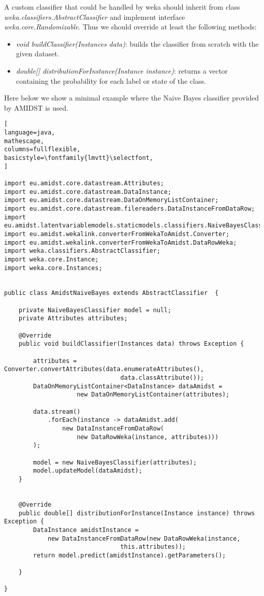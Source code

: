 \documentclass[10pt,a4paper]{article}
\begin{document}
A custom classifier that could be handled by weka should inherit from class \textit{weka.classifiers.AbstractClassifier} and implement interface \textit{weka.core.Randomizable}. Thus we should override at least the following methods:

\begin{itemize}
	\item \textit{void buildClassifier(Instances data)}: builds the classifier from scratch with the given dataset.
	\item \textit{double[] distributionForInstance(Instance instance)}: returns a vector containing the probability for each label or state of the class.
\end{itemize}

Here below we show a minimal example where the Naive Bayes classifier provided by AMIDST is used.

\begin{lstlisting}[
language=java,
mathescape,
columns=fullflexible,
basicstyle=\fontfamily{lmvtt}\selectfont,
]

import eu.amidst.core.datastream.Attributes;
import eu.amidst.core.datastream.DataInstance;
import eu.amidst.core.datastream.DataOnMemoryListContainer;
import eu.amidst.core.datastream.filereaders.DataInstanceFromDataRow;
import eu.amidst.latentvariablemodels.staticmodels.classifiers.NaiveBayesClassifier;
import eu.amidst.wekalink.converterFromWekaToAmidst.Converter;
import eu.amidst.wekalink.converterFromWekaToAmidst.DataRowWeka;
import weka.classifiers.AbstractClassifier;
import weka.core.Instance;
import weka.core.Instances;


public class AmidstNaiveBayes extends AbstractClassifier  {
	
	private NaiveBayesClassifier model = null;
	private Attributes attributes;
	
	@Override
	public void buildClassifier(Instances data) throws Exception {
		
		attributes = Converter.convertAttributes(data.enumerateAttributes(), 
								data.classAttribute());
		DataOnMemoryListContainer<DataInstance> dataAmidst = 
					new DataOnMemoryListContainer(attributes);
					
		data.stream()
			.forEach(instance -> dataAmidst.add(
				new DataInstanceFromDataRow(
					new DataRowWeka(instance, attributes)))
		);
		
		model = new NaiveBayesClassifier(attributes);
		model.updateModel(dataAmidst);
	}
	
	
	@Override
	public double[] distributionForInstance(Instance instance) throws Exception {
		DataInstance amidstInstance = 
			new DataInstanceFromDataRow(new DataRowWeka(instance, 
								this.attributes));
		return model.predict(amidstInstance).getParameters();
		
	}

}


\end{lstlisting}
\end{document}
